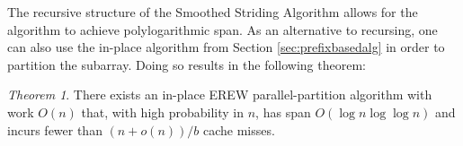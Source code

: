 \documentclass[sigconf]{acmart}
\newcommand{\defn}[1]{{\textit{\textbf{\boldmath #1}}}}
\renewcommand{\paragraph}[1]{\vspace{0.09in}\noindent{\bf \boldmath #1.}}
\theoremstyle{remark}
\newtheorem{theorem}{Theorem}[section]
\theoremstyle{remark}
\begin{document}
The recursive structure of the Smoothed Striding Algorithm allows for
the algorithm to achieve polylogarithmic span. As an alternative to
recursing, one can also use the in-place algorithm from Section \ref{sec:prefixbasedalg}
 in order to partition the subarray. Doing so results in the following theorem:
\begin{theorem}
  \label{thm:nicethm}
  There exists an in-place EREW parallel-partition algorithm with
  work $O(n)$ that, with high probability in $n$, has span $O(\log n \log \log
  n)$ and incurs fewer than $(n+o(n))/b$ cache misses.
\end{theorem}



\end{document}
